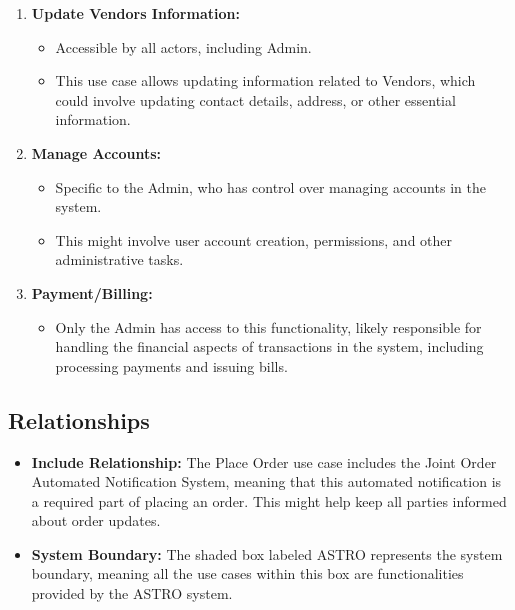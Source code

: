 \begin{enumerate}
    \item \textbf{Update Vendors Information:}
          \begin{itemize}
              \item Accessible by all actors, including Admin.
              \item This use case allows updating information related to Vendors, which could involve updating contact details, address, or other essential information.
          \end{itemize}

    \item \textbf{Manage Accounts:}
          \begin{itemize}
              \item Specific to the Admin, who has control over managing accounts in the system.
              \item This might involve user account creation, permissions, and other administrative tasks.
          \end{itemize}

    \item \textbf{Payment/Billing:}
          \begin{itemize}
              \item Only the Admin has access to this functionality, likely responsible for handling the financial aspects of transactions in the system, including processing payments and issuing bills.
          \end{itemize}
\end{enumerate}
\subsection{Relationships}

\begin{itemize}
    \item \textbf{Include Relationship:}
          The Place Order use case includes the Joint Order Automated Notification System, meaning that this automated notification is a required part of placing an order. This might help keep all parties informed about order updates.


    \item \textbf{System Boundary:}
          The shaded box labeled ASTRO represents the system boundary, meaning all the use cases within this box are functionalities provided by the ASTRO system.

\end{itemize}